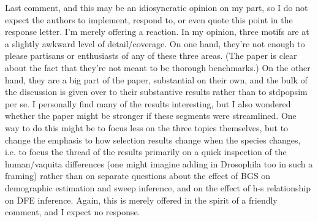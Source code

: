   \begin{point}{}
    Last comment, and this may be an idiosyncratic opinion on my part, so I do not expect the authors to implement, 
    respond to, or even quote this point in the response letter. I'm merely offering a reaction. 
    In my opinion, three motifs are at a slightly awkward level of detail/coverage. 
    On one hand, they're not enough to please partisans or enthusiasts of any of these three areas. 
    (The paper is clear about the fact that they're not meant to be thorough benchmarks.) 
    On the other hand, they are a big part of the paper, substantial on their own, 
    and the bulk of the discussion is given over to their substantive results rather than to stdpopsim per se. 
    I personally find many of the results interesting, but I also wondered whether the paper might be stronger 
    if these segments were streamlined. One way to do this might be to focus less on the three topics themselves, 
    but to change the emphasis to how selection results change when the species changes, 
    i.e. to focus the thread of the results primarily on a quick inspection of the human/vaquita differences
    (one might imagine adding in Drosophila too in such a framing) rather than on separate questions about the effect of 
    BGS on demographic estimation and sweep inference, and on the effect of h-s relationship on DFE inference. 
    Again, this is merely offered in the spirit of a friendly comment, and I expect no response.
  \end{point}
  
  

